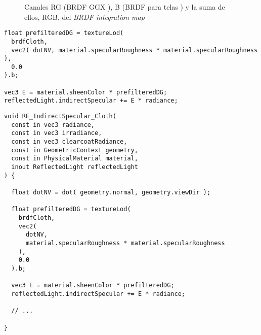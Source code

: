 

      \begin{figure}[H]
        \vspace{0.5cm}
        \centering
        \caption{Canales RG (BRDF GGX \autocite{ggx}), B (BRDF para telas \autocite{filament}) y la suma de ellos,
        RGB, del \textit{BRDF integration map}}
        \vspace{0.5cm}
      \end{figure}

    \begin{lstlisting}[caption=C\'alculo de la irradiancia del entorno para el modelo de telas utilizando el nuevo \textit{BRDF integration map}]
float prefilteredDG = textureLod(
  brdfCloth,
  vec2( dotNV, material.specularRoughness * material.specularRoughness ),
  0.0
).b;

vec3 E = material.sheenColor * prefilteredDG;
reflectedLight.indirectSpecular += E * radiance;
    \end{lstlisting}
    \singlespacing

    \begin{lstlisting}[caption=C\'alculo de iluminaci\'on indirecta especular de \textit{MeshClothMaterial}]
void RE_IndirectSpecular_Cloth(
  const in vec3 radiance,
  const in vec3 irradiance,
  const in vec3 clearcoatRadiance,
  const in GeometricContext geometry,
  const in PhysicalMaterial material,
  inout ReflectedLight reflectedLight
) {

  float dotNV = dot( geometry.normal, geometry.viewDir );

  float prefilteredDG = textureLod(
    brdfCloth,
    vec2(
      dotNV,
      material.specularRoughness * material.specularRoughness
    ),
    0.0
  ).b;

  vec3 E = material.sheenColor * prefilteredDG;
  reflectedLight.indirectSpecular += E * radiance;

  // ...

}
    \end{lstlisting}
    \singlespacing

